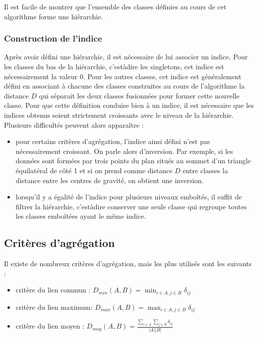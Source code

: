 \documentclass[letterpaper,10pt,french]{sphinxmanual}
\begin{document}
\sphinxAtStartPar
Il est facile de montrer que l’ensemble des classes définies au cours de cet algorithme forme une hiérarchie.


\subsubsection{Construction de l’indice}
\label{\detokenize{clustering:construction-de-l-indice}}
\sphinxAtStartPar
Après avoir défini une hiérarchie, il est nécessaire de lui associer un indice. Pour les classes du bas de la hiérarchie, c’est\sphinxhyphen{}à\sphinxhyphen{}dire les singletons, cet indice est nécessairement la valeur 0. Pour les autres classes, cet indice est généralement
défini en associant à chacune des classes construites au cours de l’algorithme la distance \(D\) qui séparait les deux classes fusionnées pour former cette nouvelle classe. Pour que cette définition conduise bien à un indice, il est nécessaire que
les indices obtenus soient strictement croissants avec le niveau de la hiérarchie. Plusieurs difficultés peuvent alors apparaître :
\begin{itemize}
\item {} 
\sphinxAtStartPar
pour certains critères d’agrégation, l’indice ainsi défini n’est pas nécessairement croissant. On parle alors d’inversion. Par exemple, si les données sont formées par trois points du plan situés au sommet d’un triangle équilatéral de côté 1 et si on prend comme distance \(D\) entre classes la distance entre les centres de gravité, on obtient une inversion.

\item {} 
\sphinxAtStartPar
lorsqu’il y a égalité de l’indice pour plusieurs niveaux emboîtés, il suffit de filtrer la hiérarchie, c’est\sphinxhyphen{}à\sphinxhyphen{}dire conserver une seule classe qui regroupe toutes les classes emboîtées ayant le même indice.

\end{itemize}


\subsection{Critères d’agrégation}
\label{\detokenize{clustering:criteres-d-agregation}}
\sphinxAtStartPar
Il existe de nombreux critères d’agrégation, mais les plus utilisés sont les suivants :
\begin{itemize}
\item {} 
\sphinxAtStartPar
critère du lien commun : \(D_{min}(A,B)=\displaystyle\min_{i\in A,j\in B}\delta_{ij}\)

\item {} 
\sphinxAtStartPar
critère du lien maximum: \(D_{max}(A,B)=\displaystyle\max_{i\in A,j\in B}\delta_{ij}\)

\item {} 
\sphinxAtStartPar
critère du lien moyen : \(D_{moy}(A,B)=\frac{\displaystyle\sum_{i\in A}\displaystyle\sum_{j\in B}\delta_{ij}}{|A||B|}\)

\end{itemize}
\end{document}
